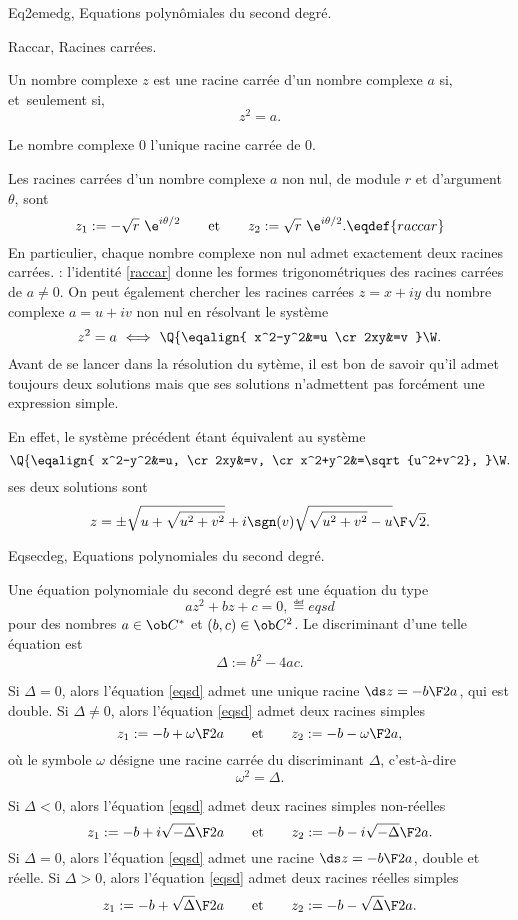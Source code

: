 \Section Eq2emedg, Equations polyn\^omiales du second degr\'e. 

\Subsection Raccar, Racines carr\'ees. 

\Definition [] Un nombre complexe {$z$ est une racine carr\'ee d'un nombre complexe $a$} si, et~seulement si, 
$$
{z^2=a}.
$$
\medskip

\Propriete [] Le nombre complexe $0$ l'unique racine carr\'ee de $0$. \par
\noindent Les racines carr\'ees d'un nombre complexe {$a$ non nul, de module $r$ et d'argument $\theta$}, sont 
$$
z_1:={-\sqrt r\ \e^{i\theta/2}}\qquad\mbox{et}\qquad z_2:={\sqrt r\ \e^{i\theta/2}}. \eqdef{raccar}
$$
En particulier, chaque nombre complexe non nul admet exactement deux racines carr\'ees. 
\bigskip
\Remarque : l'identit\'e \eqref{raccar} donne les formes trigonom\'etriques des racines carr\'ees de $a\neq0$. 
On peut \'egalement chercher les racines carr\'ees $z=x+iy$ du nombre complexe $a=u+iv$ non nul
en r\'esolvant le syst\`eme
$$
z^2=a\ \Longleftrightarrow\ \Q\{\eqalign{
x^2-y^2&=u
\cr
2xy&=v
}\W.
$$
Avant de se lancer dans la r\'esolution du syt\`eme, il est bon de savoir qu'il admet toujours deux solutions 
mais que ses solutions n'admettent pas forc\'ement une expression simple. 

En effet, le syst\`eme pr\'ec\'edent \'etant \'equivalent au syst\`eme 
$$
 \Q\{\eqalign{
x^2-y^2&=u,
\cr
2xy&=v,
\cr
x^2+y^2&=\sqrt{u^2+v^2},
}\W.
$$
ses deux solutions sont 
$$
z=\pm{\sqrt{u+\sqrt{u^2+v^2}}+i\sgn(v)\sqrt{\sqrt{u^2+v^2}-u}\F\sqrt2}.
$$


\Subsection Eqsecdeg, Equations polynomiales du second degr\'e. 

\Definition [] Une \'equation polynomiale du second degr\'e est une \'equation du type 
$$
az^2+bz+c=0,\eqdef{eqsd}
$$
pour des nombres $a\in\ob C^*$ et $(b,c)\in\ob C^2$. Le {discriminant} d'une telle \'equation est 
$$
{\Delta:=b^2-4ac}. 
$$
\bigskip

\Theoreme [$a\in\ob C^*$ et ${(a,b)}\in\ob C^2$]
\Bullet Si {$\Delta=0$}, alors l'\'equation \eqref{eqsd} admet une {unique racine} $\ds z={-b\F2a}$, qui est {double}.
\Bullet Si {$\Delta\neq0$}, alors l'\'equation \eqref{eqsd} admet {deux racines simples} 
$$
z_1:={-b+\omega\F2a}\qquad\mbox{et}\qquad z_2:={-b-\omega\F2a},
$$
o\`u le symbole $\omega$ d\'esigne une racine carr\'ee du discriminant $\Delta$, c'est-\`a-dire 
 $$
\omega^2=\Delta.
$$

\Bullet Si {$\Delta<0$}, alors l'\'equation \eqref{eqsd} admet {deux racines simples non-r\'eelles}  
$$
z_1:={-b+i\sqrt{-\Delta}\F2a}\qquad\mbox{et}\qquad z_2:={-b-i\sqrt{-\Delta}\F2a}.
$$
\Bullet Si {$\Delta=0$}, alors l'\'equation \eqref{eqsd} admet {une racine} $\ds z={-b\F2a}$, {double et r\'eelle}.\smallskip
\Bullet Si {$\Delta>0$}, alors l'\'equation \eqref{eqsd} admet {deux racines r\'eelles simples} 
$$
z_1:={-b+\sqrt\Delta\F2a}\qquad\mbox{et}\qquad z_2:={-b-\sqrt\Delta\F2a}.
$$

